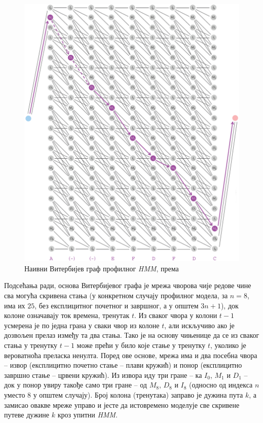 \documentclass[12pt,oneside]{memoir}
\begin{document}
\begin{CJK}{UTF8}{ipxm}
\begin{figure}[H]
  \centering
  \includegraphics[width=\textwidth]{prof_vit.png}
  \caption{Наивни Витербијев граф профилног \textit{HMM}, према \cite{compeau2015}}
  \label{fig:prof_vit}
\end{figure}

Подсећања ради, основа Витербијевог графа је мрежа чворова чије редове чине сва могућа скривена стања (у конкретном случају профилног модела, за $n = 8$, има их $25$, без експлицитног почетног и завршног, а у општем $3n+1$), док колоне означавају ток времена, тренутак $t$. Из сваког чвора у колони $t-1$ усмерена је по једна грана у сваки чвор из колоне $t$, али искључиво ако је дозвољен прелаз између та два стања. Тако је на основу чињенице да се из сваког стања у тренутку $t-1$ може прећи у било које стање у тренутку $t$, уколико је вероватноћа преласка ненулта. Поред ове основе, мрежа има и два посебна чвора -- извор (експлицитно почетно стање -- плави кружић) и понор (експлицитно завршно стање -- црвени кружић). Из извора иду три гране -- ка $I_0$, $M_1$ и $D_1$ -- док у понор увиру такође само три гране -- од $M_8$, $D_8$ и $I_8$ (односно од индекса $n$ уместо $8$ у општем случају). Број колона (тренутака) заправо је дужина пута $k$, а замисао овакве мреже управо и јесте да истовремено моделује све скривене путеве дужине $k$ кроз упитни \textit{HMM}.


\end{CJK}
\end{document}
